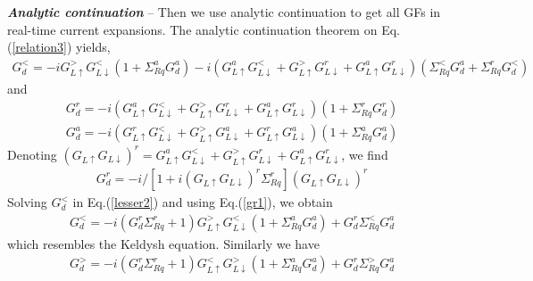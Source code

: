 \documentclass[aps,prb,superscriptaddress]{revtex4-2}
\begin{document}
{\noindent \textbf{\textit{Analytic continuation}}} -- Then we use analytic continuation to get all GFs in real-time current expansions. The analytic continuation theorem on Eq.(\ref{relation3}) yields,
\begin{eqnarray}
G_{d}^< =-iG^>_{L\uparrow}G^<_{L\downarrow} (1+ \Sigma^a_{Rq} G^a_{d})
 -i(G^a_{L\uparrow}G^<_{L\downarrow}+G^>_{L\uparrow}G^r_{L\downarrow}+
  G^a_{L\uparrow}G^r_{L\downarrow}) ( \Sigma^<_{Rq} G^a_{d} + \Sigma^r_{Rq} G^<_{d}) \label{lesser2}
\end{eqnarray}
and
\begin{eqnarray}
G_{d}^r = -i(G^a_{L\uparrow}G^<_{L\downarrow}+G^>_{L\uparrow}G^r_{L\downarrow} + G^a_{L\uparrow}G^r_{L\downarrow}) ( 1+\Sigma^r_{Rq} G^r_{d} ) \nonumber
\end{eqnarray}
\begin{eqnarray}
G_{d}^a = -i(G^r_{L\uparrow}G^<_{L\downarrow}+G^>_{L\uparrow}G^a_{L\downarrow} + G^r_{L\uparrow}G^a_{L\downarrow}) ( 1+\Sigma^a_{Rq} G^a_{d} ) \nonumber
\end{eqnarray}
Denoting $(G_{L\uparrow}G_{L\downarrow})^r = G^a_{L\uparrow}G^<_{L\downarrow}+G^>_{L\uparrow}G^r_{L\downarrow} + G^a_{L\uparrow}G^r_{L\downarrow}$, we find
\begin{eqnarray}
G_{d}^r = -i/[1+i(G_{L\uparrow}G_{L\downarrow})^r \Sigma^r_{Rq}]  (G_{L\uparrow}G_{L\downarrow})^r \label{gr1}
\end{eqnarray}
Solving $G^<_d$ in Eq.(\ref{lesser2}) and using Eq.(\ref{gr1}), we obtain
\begin{eqnarray}
G_{d}^< =-i(G^r_{d}\Sigma^r_{Rq} +1 ) G^>_{L\uparrow}G^<_{L\downarrow} (1+ \Sigma^a_{Rq} G^a_{d})
 + G^r_{d} \Sigma^<_{Rq} G^a_{d}  \label{lesser3}
\end{eqnarray}
which resembles the Keldysh equation. Similarly we have
\begin{eqnarray}
G_{d}^> =-i(G^r_{d}\Sigma^r_{Rq} +1 ) G^<_{L\uparrow}G^>_{L\downarrow} (1+ \Sigma^a_{Rq} G^a_{d})
 + G^r_{d} \Sigma^>_{Rq} G^a_{d}  \label{greater1}
\end{eqnarray}
\end{document}
